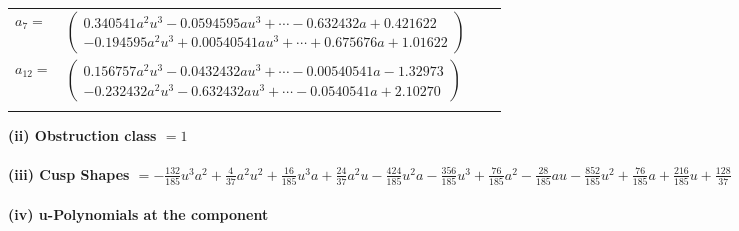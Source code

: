 \documentclass[1p]{elsarticle_modified}
\theoremstyle{definition}
\begin{document}
\begin{tabular}{m{7pt} m{180pt} m{7pt} m{180pt} }
\flushright $a_{7}=$&$\begin{pmatrix}0.340541 a^{2} u^{3}-0.0594595 a u^{3}+\cdots-0.632432 a+0.421622\\-0.194595 a^{2} u^{3}+0.00540541 a u^{3}+\cdots+0.675676 a+1.01622\end{pmatrix}$ \\
\flushright $a_{12}=$&$\begin{pmatrix}0.156757 a^{2} u^{3}-0.0432432 a u^{3}+\cdots-0.00540541 a-1.32973\\-0.232432 a^{2} u^{3}-0.632432 a u^{3}+\cdots-0.0540541 a+2.10270\end{pmatrix}$\\&\end{tabular}
\flushleft \textbf{(ii) Obstruction class $= 1$}\\~\\
\flushleft \textbf{(iii) Cusp Shapes $= -\frac{132}{185} u^3 a^2+\frac{4}{37} a^2 u^2+\frac{16}{185} u^3 a+\frac{24}{37} a^2 u-\frac{424}{185} u^2 a-\frac{356}{185} u^3+\frac{76}{185} a^2-\frac{28}{185} a u-\frac{852}{185} u^2+\frac{76}{185} a+\frac{216}{185} u+\frac{128}{37}$}\\~\\
\newpage\renewcommand{\arraystretch}{1}
\flushleft \textbf{(iv) u-Polynomials at the component}\newline \\
\end{document}
